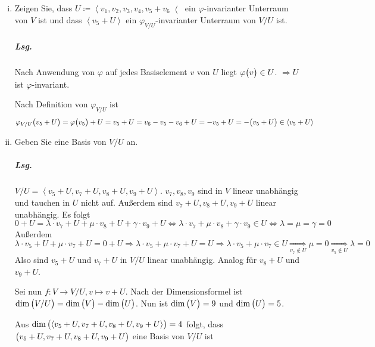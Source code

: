 \documentclass{scrreprt}
\begin{document}
\begin{enumerate}[(i)]
\item Zeigen Sie, dass
  $U \coloneqq \left\langle v_1, v_2, v_3, v_4, v_5 + v_6 \right\langle$ ein
  $\varphi$-invarianter Unterraum von $V$ ist und dass
  $\left\langle v_5 + U \right\rangle$ ein $\varphi_{V / U}$-invarianter
  Unterraum von $V / U$ ist.

  \subparagraph{Lsg.} Nach Anwendung von $\varphi$ auf jedes Basiselement $v$ von
  $U$ liegt $\varphi\qty\big(v) \in U$.
  $\Rightarrow U$ ist $\varphi$-invariant.

  Nach Definition von $\varphi_{V / U}$ ist
  \[
    \varphi_{V / U}\qty\big(v_5 + U) = \varphi\qty\big(v_5) + U = v_5 + U
    = v_6 - v_5 - v_6 + U = -v_5 + U = -\qty\big(v_5 + U) \in
    \left\langle v_5 + U \right\rangle
  \]

\item Geben Sie eine Basis von $V / U$ an.

  \subparagraph{Lsg.} $V / U = \left\langle
    v_5 + U, v_7 + U, v_8 + U, v_9 + U
  \right\rangle$.
  $v_7, v_8, v_9$ sind in $V$ linear unabhängig und tauchen in $U$ nicht auf.
  Außerdem sind $v_7 + U, v_8 + U, v_9 + U$ linear unabhängig.
  Es folgt
  \[
    0 + U = \lambda \cdot v_7 + U + \mu \cdot v_8 + U + \gamma \cdot v_9 + U
    \iff \lambda \cdot v_7 + \mu \cdot v_8 + \gamma \cdot v_9 \in U
    \iff \lambda = \mu = \gamma = 0
  \]
  Außerdem
  \[
    \lambda \cdot v_5 + U + \mu \cdot v_7 + U = 0 + U \Rightarrow
    \lambda \cdot v_5 + \mu \cdot v_7 + U = U \Rightarrow
    \lambda \cdot v_5 + \mu \cdot v_7 \in U
    \underset{v_7 \notin U}\Rightarrow \mu = 0
    \underset{v_5 \notin U}\Rightarrow \lambda = 0
  \]
  Also sind $v_5 + U$ und $v_7 + U$ in $V/U$ linear unabhängig.
  Analog für $v_8 + U$ und $v_9 + U$.

  Sei nun $f \colon V \to V / U, v \mapsto v + U$.
  Nach der Dimensionsformel ist
  $\dim\qty\big(V / U) = \dim\qty\big(V) - \dim\qty\big(U)$.
  Nun ist $\dim\qty\big(V) = 9$ und $\dim\qty\big(U) = 5$.

  Aus $\dim\qty\big(\left\langle
    v_5 + U, v_7 + U, v_8 + U, v_9 + U
  \right\rangle) = 4$ folgt, dass $\qty\big(v_5 + U, v_7 + U, v_8 + U, v_9 + U)$
  eine Basis von $V / U$ ist
\end{enumerate}
\end{document}
